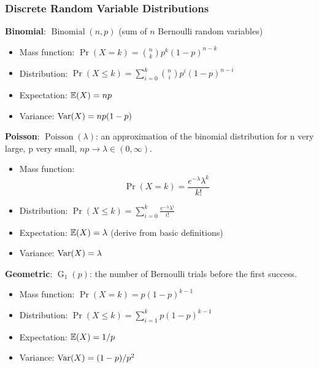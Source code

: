 \subsubsection{Discrete Random Variable Distributions}

\textbf{Binomial}: \(\operatorname{Binomial}(n, p)\) (sum of \(n\) Bernoulli random variables)

\begin{itemize}

\item Mass function: \(\Pr(X = k) = \binom{n}{k}p^k(1-p)^{n-k}  \)

\item Distribution: \(\Pr(X \leq k) = \sum_{i=0}^k \binom{n}{i}p^i(1-p)^{n-i} \)

\item Expectation: \(\E(X) = np \)

\item Variance: \(\Var(X) = np(1-p) \)

\end{itemize}

\textbf{Poisson}:  \(\operatorname{Poisson}(\lambda)\): an approximation of the binomial distribution for n very large, p very small, \(np \to \lambda \in (0, \infty)\).

\begin{itemize}

\item Mass function: \[\Pr(X = k) =  \frac{e^{-\lambda}\lambda^k}{k!} \]

\item Distribution: \(\Pr(X \leq k) = \sum_{i=0}^k  \frac{e^{-\lambda}\lambda^i}{i!}  \)

\item Expectation: \(\E(X) = \lambda \) (derive from basic definitions)

\item Variance: \(\Var(X) = \lambda\)

\end{itemize}

\textbf{Geometric}:  \(\operatorname{G}_1(p)\): the number of Bernoulli trials before the first success.

\begin{itemize}

\item Mass function: \(\Pr(X = k) = p(1-p)^{k-1} \)

\item Distribution: \(\Pr(X \leq k) = \sum_{i=1}^k p(1-p)^{k-1}  \)

\item Expectation: \(\E(X) = 1/p \)

\item Variance: \(\Var(X) = (1-p)/p^2\)

\end{itemize}


